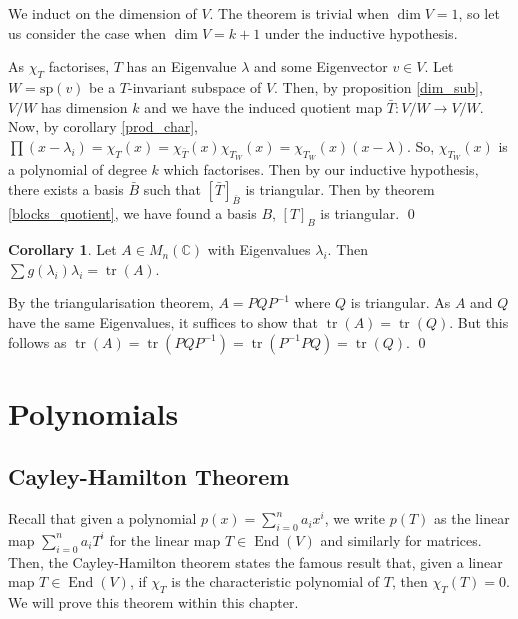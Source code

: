 \documentclass[
]{article}
\theoremstyle{definition}
\newtheorem{corollary}{Corollary}[theorem]
\theoremstyle{definition}
\begin{document}
\proof

We induct on the dimension of \(V\). The theorem is trivial when
\(\dim V = 1\), so let us consider the case when \(\dim V = k + 1\)
under the inductive hypothesis.

As \(\chi_T\) factorises, \(T\) has an Eigenvalue \(\lambda\) and some
Eigenvector \(v \in V\). Let \(W = \text{sp}(v)\) be a \(T\)-invariant
subspace of \(V\). Then, by proposition \ref{dim_sub}, \(V / W\) has
dimension \(k\) and we have the induced quotient map
\(\bar{T} : V / W \to V / W\). Now, by corollary \ref{prod_char},
\(\prod (x - \lambda_i) = \chi_T(x) =  \chi_{\bar{T}}(x) \chi_{T_W}(x) = \chi_{T_W}(x)(x - \lambda)\).
So, \(\chi_{T_W}(x)\) is a polynomial of degree \(k\) which factorises.
Then by our inductive hypothesis, there exists a basis \(\bar{B}\) such
that \([\bar{T}]_{\bar{B}}\) is triangular. Then by theorem
\ref{blocks_quotient}, we have found a basis \(B\), \([T]_B\) is
triangular. \qed

\begin{corollary}
  Let \(A \in M_n(\mathbb{C})\) with Eigenvalues \(\lambda_i\). Then 
  \(\sum g(\lambda_i)\lambda_i = \mathop{\mathrm{tr}}(A)\).
\end{corollary}
\proof

By the triangularisation theorem, \(A = PQP^{-1}\) where \(Q\) is
triangular. As \(A\) and \(Q\) have the same Eigenvalues, it suffices to
show that \(\mathop{\mathrm{tr}}(A) = \mathop{\mathrm{tr}}(Q)\). But
this follows as
\(\mathop{\mathrm{tr}}(A) = \mathop{\mathrm{tr}}(PQP^{-1}) =  \mathop{\mathrm{tr}}(P^{-1}PQ) = \mathop{\mathrm{tr}}(Q)\).
\qed

\newpage

\hypertarget{polynomials}{%
\section{Polynomials}\label{polynomials}}

\hypertarget{cayley-hamilton-theorem}{%
\subsection{Cayley-Hamilton Theorem}\label{cayley-hamilton-theorem}}

Recall that given a polynomial \(p(x) = \sum_{i = 0}^n a_i x^i\), we
write \(p(T)\) as the linear map \(\sum_{i = 0}^n a_i T^i\) for the
linear map \(T \in \mathop{\mathrm{End}}(V)\) and similarly for
matrices. Then, the Cayley-Hamilton theorem states the famous result
that, given a linear map \(T \in \mathop{\mathrm{End}}(V)\), if
\(\chi_T\) is the characteristic polynomial of \(T\), then
\(\chi_T(T) = 0\). We will prove this theorem within this chapter.
\end{document}
